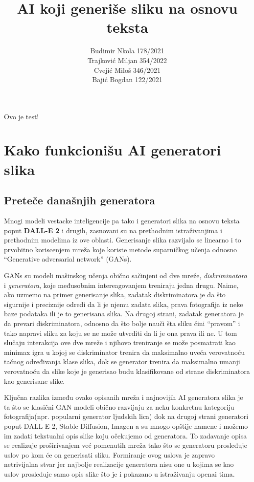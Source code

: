 \documentclass[12pt, letterpaper]{article}
\title{AI koji generiše sliku na osnovu teksta}
\author{Budimir Nkola 178/2021\\Trajković Miljan 354/2022\\Cvejić Miloš 346/2021\\Bajić Bogdan 122/2021}
\begin{document}
\maketitle
Ovo je test!

\begin{abstract}
\end{abstract}

\begin{tableofcontents}
\end{tableofcontents}

\pagebreak
\section{Kako funkcionišu AI generatori slika}
\subsection*{Preteče današnjih generatora}
Mnogi modeli vestacke inteligencije pa tako i generatori slika na osnovu teksta poput \textbf{DALL-E 2} i drugih, zasnovani su na prethodnim istraživanjima i prethodnim modelima iz ove oblasti.
Generisanje slika razvijalo se linearno i to prvobitno koriscenjem mreža koje koriste metode suparničkog učenja odnosno “Generative adversarial network” (GANs).

GANs su modeli mašinskog učenja obično sačinjeni od dve mreže, \textit{diskriminatora} i \textit{generatora}, koje međusobnim intereagovanjem treniraju jedna drugu. Naime, ako uzmemo na primer generisanje slika, zadatak diskriminatora je da što sigurnije i preciznije odredi da li je njemu zadata slika, prava fotografija iz neke baze podataka ili je to generisana slika. Na drugoj strani, zadatak generatora je da prevari diskriminatora, odnosno da što bolje nauči šta sliku čini “pravom” i tako napravi sliku za koju se ne može utvrditi da li je ona prava ili ne. U tom slučaju interakcija ove dve mreže i njihovo treniranje se može posmatrati kao minimax igra u kojoj se diskriminator trenira da maksimalno uveća verovatnoću tačnog određivanja klase slika, dok se generator trenira da maksimalno umanji verovatnoću da slike koje je generisao budu klasifikovane od strane diskriminatora kao generisane slike.\cite{gan1, gan2, ganvideo}

Ključna razlika između ovako opisanih mreža i najnovijih AI generatora slika je ta što se klasični GAN modeli obično razvijaju za neku konkretnu kategoriju fotografija(npr. popularni generator ljudskih lica)\cite{gen1} dok na drugoj strani generatori poput DALL-E 2, Stable Diffusion, Imagen-a su mnogo opštije namene i možemo im zadati tekstualni opis slike koju očekujemo od generatora. To zadavanje opisa se realizuje proširivanjem već pomenutih mreža tako što se generatoru prosleđuje uslov po kom će on generisati sliku.\cite{openai_dali, openai_glide, asembli} 
Formiranje ovog uslova je zapravo netrivijalna stvar jer najbolje realizacije generatora nisu one u kojima se kao uslov prosleđuje samo opis slike što je i pokazano u istraživanju openai tima.\cite{openai_dali}
\end{document}
